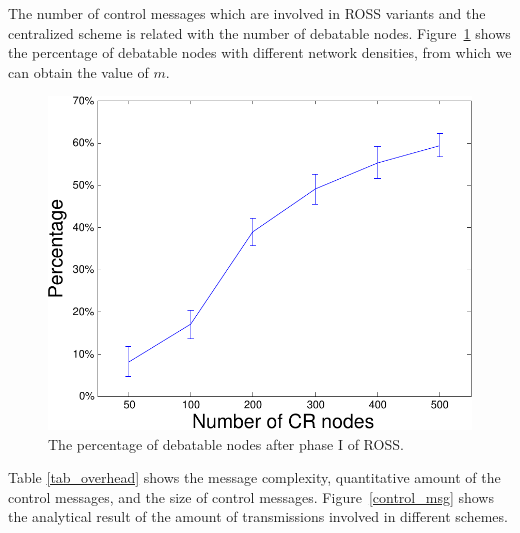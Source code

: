 \documentclass[10pt,journal,compsoc]{IEEEtran}
\theoremstyle{mytheoremstyle}
\theoremstyle{mytheoremstyle}
\theoremstyle{mytheoremstyle}
\begin{document}
The number of control messages which are involved in ROSS variants and the centralized scheme is related with the number of debatable nodes.
Figure~\ref{percentage_overlapping_node} shows the percentage of debatable nodes with different network densities, from which we can obtain the value of $m$.
\begin{figure}[ht!]
  \centering
  \includegraphics[width=0.6\linewidth]{percentage_overlapping_node.pdf}
  \caption{The percentage of debatable nodes after phase I of ROSS.}\label{percentage_overlapping_node}
\end{figure}
%
%
%
%
Table \ref{tab_overhead} shows the message complexity, quantitative amount of the control messages, and the size of control messages.
Figure~\ref{control_msg} shows the analytical result of the amount of transmissions involved in different schemes.
\end{document}
